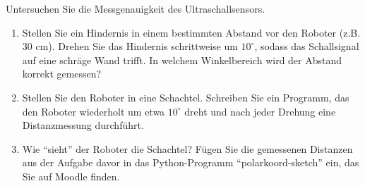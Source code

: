 
\begin{myexercise}
    Untersuchen Sie die Messgenauigkeit des Ultraschallsensors.
    \begin{enumerate}
        \item Stellen Sie ein Hindernis in einem bestimmten Abstand vor den Roboter (z.B. 30 cm). Drehen Sie das Hindernis schrittweise um \(10^\circ\), sodass das Schallsignal auf eine schräge Wand trifft. In welchem Winkelbereich wird der Abstand korrekt gemessen?
        \item Stellen Sie den Roboter in eine Schachtel. Schreiben Sie ein Programm, das den Roboter wiederholt um etwa \(10^\circ\) dreht und nach jeder Drehung eine Distanzmessung durchführt.
        \item Wie \enquote{sieht} der Roboter die Schachtel? Fügen Sie die gemessenen Distanzen aus der Aufgabe davor in das Python-Programm \enquote{polarkoord-sketch} ein, das Sie auf Moodle finden.
    \end{enumerate}
\end{myexercise}
